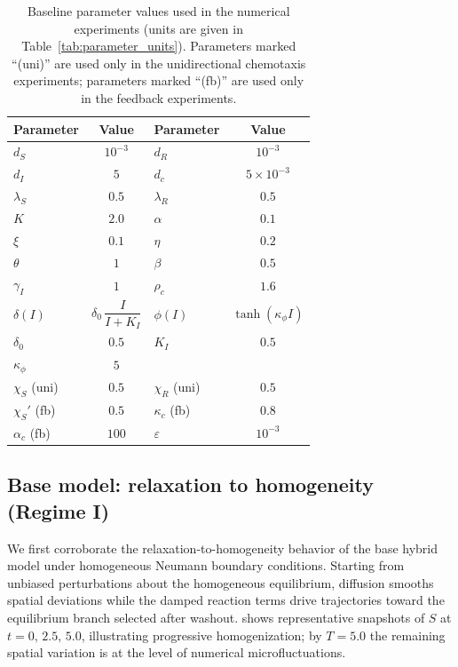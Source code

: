 \documentclass[pdflatex,sn-mathphys-ay]{sn-jnl}
\theoremstyle{thmstyleone}
\theoremstyle{definition}
\theoremstyle{remark}
\begin{document}
\begin{table}[htbp]
\centering
\caption{Baseline parameter values used in the numerical experiments (units are given in Table~\ref{tab:parameter_units}). Parameters marked ``(uni)'' are used only in the unidirectional chemotaxis experiments; parameters marked ``(fb)'' are used only in the feedback experiments.}
\label{tab:parameters}
\begin{tabular}{@{} l c l c @{}}
\toprule
Parameter        & Value       & Parameter       & Value       \\
\midrule
$d_S$            & $10^{-3}$   & $d_R$           & $10^{-3}$   \\
$d_I$            & $5$         & $d_c$           & $5\times 10^{-3}$ \\
$\lambda_S$      & $0.5$       & $\lambda_R$     & $0.5$       \\
$K$              & $2.0$       & $\alpha$        & $0.1$       \\
$\xi$            & $0.1$       & $\eta$          & $0.2$       \\
$\theta$         & $1$         & $\beta$         & $0.5$       \\
$\gamma_I$       & $1$         & $\rho_c$        & $1.6$       \\
$\delta(I)$      & $\delta_0\,\dfrac{I}{I+K_I}$ 
                & $\phi(I)$ & $\tanh(\kappa_\phi I)$ \\
$\delta_0$       & $0.5$       & $K_I$           & $0.5$       \\
$\kappa_\phi$    & $5$         &                 &             \\
$\chi_S$ (uni)   & $0.5$       & $\chi_R$ (uni)  & $0.5$       \\
$\chi_S'$ (fb)   & $0.5$       & $\kappa_c$ (fb) & $0.8$       \\
$\alpha_c$ (fb)  & $100$       & $\varepsilon$   & $10^{-3}$   \\
\bottomrule
\end{tabular}
\end{table}

\subsection{Base model: relaxation to homogeneity (Regime I)}
\label{subsec:numerical_base_regimeI}

We first corroborate the relaxation-to-homogeneity behavior of the base hybrid model under homogeneous Neumann boundary conditions. 
Starting from unbiased perturbations about the homogeneous equilibrium, diffusion smooths spatial deviations while the damped reaction terms drive trajectories toward the equilibrium branch selected after washout. 
 shows representative snapshots of $S$ at $t=0,\,2.5,\,5.0$, illustrating progressive homogenization; by $T=5.0$ the remaining spatial variation is at the level of numerical microfluctuations.
\end{document}
